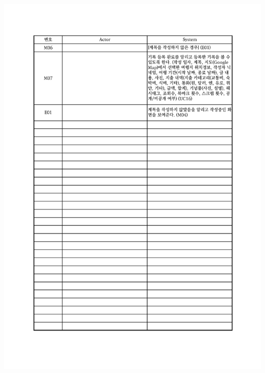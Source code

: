 {{{{{{{{{{{{{{{{\includegraphics[width=1.1\textwidth]{./Figure/Design/Display/usecase/014-2.pdf} \\
}}}}}}}}}}}}}}}}

